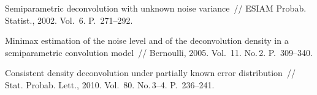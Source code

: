 \begin{multicols}{2}
{{\begin{thebibliography}{9}
 Semiparametric deconvolution with unknown noise
variance~// ESIAM Probab. Statist., 2002. Vol.~6. P.~271--292.

 Minimax estimation of the noise level
and of the deconvolution density in a semiparametric convolution
model~// Bernoulli, 2005. Vol.~11. No.\,2. P.~309--340.

 Consistent density
deconvolution under partially known error distribution~// Stat.
Probab. Lett., 2010. Vol.~80. No.\,3--4. P.~236--241.


\label{end\stat}

 \end{thebibliography}
}
}


\end{multicols}       